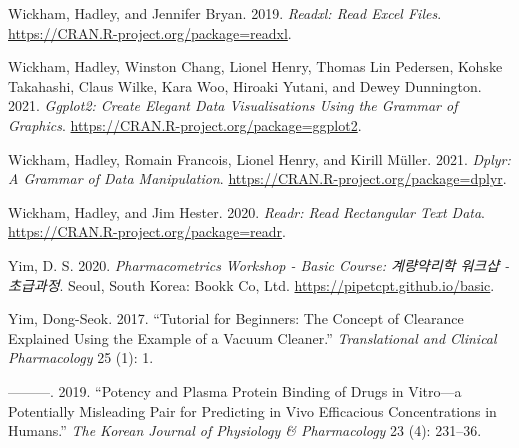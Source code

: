 \documentclass[
  11pt,
  krantz2, a4paper, twoside]{krantz}
\newlength{\cslhangindent}
\newlength{\cslentryspacingunit} %
\newenvironment{CSLReferences}[2] %
 {%
  \setlength{\parindent}{0pt}
  \ifodd #1
  \let\oldpar\par
  \def\par{\hangindent=\cslhangindent\oldpar}
  \fi
  \setlength{\parskip}{#2\cslentryspacingunit}
 }%
 {}
\theoremstyle{definition}
\theoremstyle{definition}
\theoremstyle{definition}
\theoremstyle{definition}
\theoremstyle{remark}
\begin{document}
\begin{CSLReferences}{1}{0}
\leavevmode{}%
Wickham, Hadley, and Jennifer Bryan. 2019. \emph{Readxl: Read Excel Files}. \url{https://CRAN.R-project.org/package=readxl}.

\leavevmode{}%
Wickham, Hadley, Winston Chang, Lionel Henry, Thomas Lin Pedersen, Kohske Takahashi, Claus Wilke, Kara Woo, Hiroaki Yutani, and Dewey Dunnington. 2021. \emph{Ggplot2: Create Elegant Data Visualisations Using the Grammar of Graphics}. \url{https://CRAN.R-project.org/package=ggplot2}.

\leavevmode{}%
Wickham, Hadley, Romain Francois, Lionel Henry, and Kirill Müller. 2021. \emph{Dplyr: A Grammar of Data Manipulation}. \url{https://CRAN.R-project.org/package=dplyr}.

\leavevmode{}%
Wickham, Hadley, and Jim Hester. 2020. \emph{Readr: Read Rectangular Text Data}. \url{https://CRAN.R-project.org/package=readr}.

\leavevmode{}%
Yim, D. S. 2020. \emph{Pharmacometrics Workshop - Basic Course: 계량약리학 워크샵 - 초급과정}. Seoul, South Korea: Bookk Co, Ltd. \url{https://pipetcpt.github.io/basic}.

\leavevmode{}%
Yim, Dong-Seok. 2017. {``Tutorial for Beginners: The Concept of Clearance Explained Using the Example of a Vacuum Cleaner.''} \emph{Translational and Clinical Pharmacology} 25 (1): 1.

\leavevmode{}%
---------. 2019. {``Potency and Plasma Protein Binding of Drugs in Vitro---a Potentially Misleading Pair for Predicting in Vivo Efficacious Concentrations in Humans.''} \emph{The Korean Journal of Physiology \& Pharmacology} 23 (4): 231--36.

\end{CSLReferences}

\printindex
\end{document}
